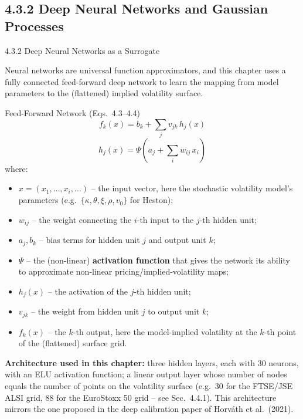 \documentclass[aspectratio=169,10pt]{beamer}
\begin{document}
\subsection{4.3.2 Deep Neural Networks and Gaussian Processes}

\begin{frame}[allowframebreaks]{4.3.2 Deep Neural Networks as a Surrogate}

Neural networks are universal function approximators, and this chapter
uses a fully connected feed-forward deep network to learn the mapping
from model parameters to the (flattened) implied volatility surface.

\begin{block}{Feed-Forward Network (Eqs.\ 4.3--4.4)}
\[
  f_k(x) = b_k + \sum_j v_{jk}\,h_j(x)
\]
\[
  h_j(x) = \Psi\!\left(a_j + \sum_i w_{ij}\,x_i\right)
\]
where:
\begin{itemize}
  \item $x = (x_1,\ldots,x_i,\ldots)$ -- the input vector, here the
        stochastic volatility model's parameters (e.g.\
        $\{\kappa,\theta,\xi,\rho,v_0\}$ for Heston);
  \item $w_{ij}$ -- the weight connecting the $i$-th input to the $j$-th
        hidden unit;
  \item $a_j, b_k$ -- bias terms for hidden unit $j$ and output unit $k$;
  \item $\Psi$ -- the (non-linear) \textbf{activation function} that
        gives the network its ability to approximate non-linear
        pricing/implied-volatility maps;
  \item $h_j(x)$ -- the activation of the $j$-th hidden unit;
  \item $v_{jk}$ -- the weight from hidden unit $j$ to output unit $k$;
  \item $f_k(x)$ -- the $k$-th output, here the model-implied volatility
        at the $k$-th point of the (flattened) surface grid.
\end{itemize}
\end{block}

\framebreak

\textbf{Architecture used in this chapter:} three hidden layers, each
with 30 neurons, with an ELU activation function; a linear output layer
whose number of nodes equals the number of points on the volatility
surface (e.g.\ 30 for the FTSE/JSE ALSI grid, 88 for the EuroStoxx 50
grid -- see Sec.\ 4.4.1). This architecture mirrors the one proposed in
the deep calibration paper of Horv\'ath et al.\ (2021).


\end{frame}
\end{document}

